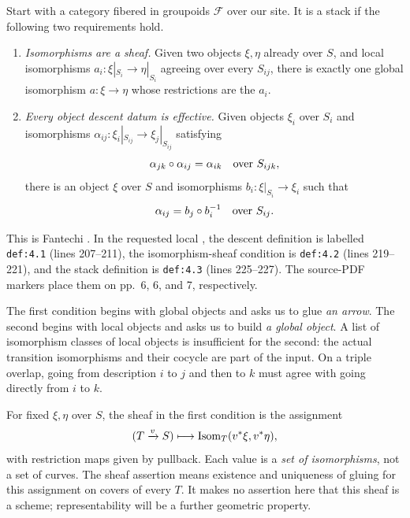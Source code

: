 \begin{Def}\label{def:stack}
Start with a category fibered in groupoids $\mathcal F$ over our site.
It is a stack if the following two requirements hold.
\begin{enumerate}
\item \emph{Isomorphisms are a sheaf.} Given two objects $\xi,\eta$
already over $S$, and local isomorphisms
$a_i:\xi|_{S_i}\to\eta|_{S_i}$ agreeing over every $S_{ij}$,
there is exactly one global isomorphism $a:\xi\to\eta$ whose
restrictions are the $a_i$.
\item \emph{Every object descent datum is effective.} Given objects
$\xi_i$ over $S_i$ and isomorphisms
$\alpha_{ij}:\xi_i|_{S_{ij}}\to\xi_j|_{S_{ij}}$ satisfying
\begin{equation}\label{eq:cocycle}
\alpha_{jk}\circ\alpha_{ij}=\alpha_{ik}\quad\hbox{over }S_{ijk},
\end{equation}
there is an object $\xi$ over $S$ and isomorphisms
$b_i:\xi|_{S_i}\to\xi_i$ such that
\begin{equation}\label{eq:effective}
             \alpha_{ij}=b_j\circ b_i^{-1}\quad\hbox{over }S_{ij}.
\end{equation}
\end{enumerate}
\end{Def}

This is Fantechi \cite[Sections 4.2--4.3, Definitions 4.1--4.3]{Fantechi}.
In the requested local , the descent
definition is labelled \texttt{def:4.1} (lines 207--211), the
isomorphism-sheaf condition is \texttt{def:4.2} (lines 219--221),
and the stack definition is \texttt{def:4.3} (lines 225--227).
The source-PDF markers place them on pp.~6, 6, and 7, respectively.

The first condition begins with global objects and asks us to glue
\emph{an arrow}. The second begins with local objects and asks us
to build \emph{a global object}. A list of isomorphism classes of
local objects is insufficient for the second: the actual transition
isomorphisms and their cocycle are part of the input. On a triple
overlap, going from description $i$ to $j$ and then to $k$ must
agree with going directly from $i$ to $k$.

For fixed $\xi,\eta$ over $S$, the sheaf in the first condition is
the assignment
\[
(T\xrightarrow{v}S)\longmapsto
\operatorname{Isom}_T(v^*\xi,v^*\eta),
\]
with restriction maps given by pullback. Each value is a \emph{set
of isomorphisms}, not a set of curves. The sheaf assertion means
existence and uniqueness of gluing for this assignment on covers
of every $T$. It makes no assertion here that this sheaf is a
scheme; representability will be a further geometric property.

